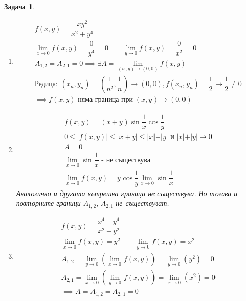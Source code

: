 \documentclass[a4paper,fleqn,12pt]{article}
\newtheorem{task}{Задача}[section]
\begin{document}
\begin{task}
\begin{enumerate}
\item 
\begin{gather*}
f(x,y) = \dfrac{xy^2}{x^2+y^4}\\
\lim\limits_{x \to 0} f(x,y) = \dfrac{0}{y^4} = 0 \qquad 
\lim\limits_{y \to 0} f(x,y) = \dfrac{0}{x^2} = 0 \\
A_{1,2} = A_{2,1} = 0 \implies \exists A = \lim\limits_{(x,y) \to (0,0)} f(x,y) \\
\text{Редица: }(x_n, y_n) = (\dfrac{1}{n^2},\dfrac{1}{n}) \to (0,0), f(x_n, y_n) = \dfrac{1}{2} \to \dfrac{1}{2} \neq 0\\
\implies f(x,y) \text{ няма граница при } (x,y) \to (0,0)
\end{gather*}

\item 
\begin{gather*}
f(x,y) = (x+y) \sin{\dfrac{1}{x}} \cos{\dfrac{1}{y}}\\
0 \leq \vert f(x,y) \vert \leq \vert x + y \vert \leq  \vert x \vert + \vert y \vert \text{ и } \vert x \vert + \vert y \vert \to 0 \\
A = 0 \\
\lim\limits_{x \to 0} \sin{\dfrac{1}{x}} \text{ - не съществува} \\
\lim\limits_{x \to 0} f(x,y) = y\cos{\dfrac{1}{y}} \lim\limits_{x \to 0} \sin{\dfrac{1}{x}}
\end{gather*}
Аналогично и другата вътрешна граница не съществува. Но тогава и повторните граници $A_{1,2},\, A_{2,1}$ не съществуват.


\item
\begin{gather*}
f(x,y) = \dfrac{x^4 + y^4}{x^2 + y^2}\\
\lim\limits_{x \to 0} f(x,y) = y^2 \qquad 
\lim\limits_{y \to 0} f(x,y) = x^2 \\
A_{1,2} = \lim\limits_{y \to 0} \left( \lim\limits_{x \to 0} f(x,y) \right) = \lim\limits_{y \to 0} \left( y^2 \right) = 0\\
A_{2,1} = \lim\limits_{x \to 0} \left( \lim\limits_{y \to 0} f(x,y) \right) = \lim\limits_{x \to 0} \left( x^2 \right) = 0 \\
\implies A = A_{1,2} = A_{2,1} = 0
\end{gather*}

\end{enumerate}

\end{task}
\end{document}
